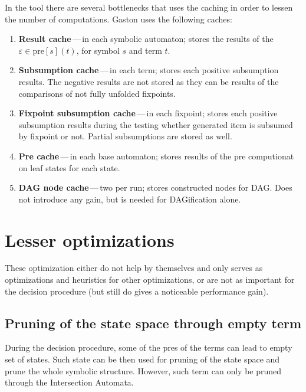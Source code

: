   In the tool there are several bottlenecks that uses the caching
  in order to lessen the number of computations. Gaston uses the
  following caches:
  \begin{enumerate}
  	\item \textbf{Result cache}\,---\,in each symbolic automaton;
  	stores the results of the $\varepsilon \in \text{pre}[s](t)$,
  	for symbol $s$ and term $t$. 
  	\item \textbf{Subsumption cache}\,---\,in each term; stores each
  	positive subsumption results. The negative results are not 
  	stored as they can be results of the comparisons of not fully
  	unfolded fixpoints. 
  	\item \textbf{Fixpoint subsumption cache}\,---\,in each fixpoint;
  	stores each positive subsumption results during the testing 
  	whether generated item is subsumed by fixpoint or not. Partial
  	subsumptions are stored as well.
  	\item \textbf{Pre cache}\,---\,in each base automaton; stores
  	results of the pre computionat on leaf states for each state.
  	\item \textbf{DAG node cache}\,---\,two per run; stores 
  	constructed nodes for DAG. Does not introduce any gain, but is
  	needed for DAGification alone.
  \end{enumerate}
  
\section{Lesser optimizations}
These optimization either do not help by themselves and only serves
as optimizations and heuristics for other optimizations, or are not
as important for the decision procedure (but still do gives a 
noticeable performance gain).

  \subsection{Pruning of the state space through empty term}
  
  During the decision procedure, some of the pres of the terms can
  lead to empty set of states. Such state can be then used for 
  pruning of the state space and prune the whole symbolic structure.
  However, such term can only be pruned through the Intersection 
  Automata.
  
